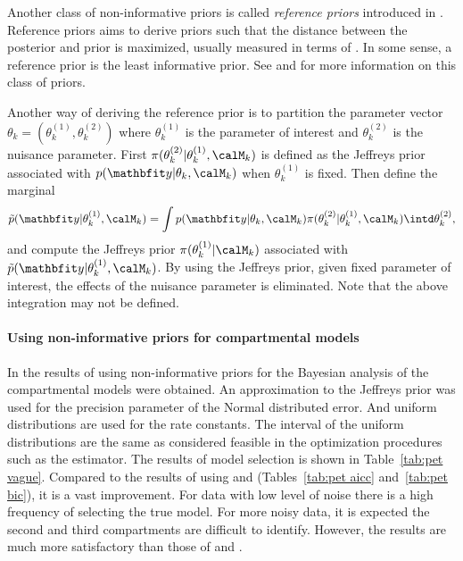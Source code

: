 Another class of non-informative priors is called \emph{reference priors}
introduced in \cite{Bernardo:1979uq}. Reference priors aims to derive priors
such that the distance between the posterior and prior is maximized, usually
measured in terms of \kld \cite{Kullback:1951va}. In some sense, a reference
prior is the least informative prior. See \cite{Berger:1989vj, Berger:1992kf,
  Berger:1992wo} and \cite[][sec.~5.4]{Bernardo:1994vd} for more information
on this class of priors.

Another way of deriving the reference prior is to partition the parameter
vector $\theta_k = (\theta_k^{(1)},\theta_k^{(2)})$ where $\theta_k^{(1)}$ is
the parameter of interest and $\theta_k^{(2)}$ is the nuisance parameter.
First $\pi(\theta_k^{(2)}|\theta_k^{(1)},\calM_k)$ is defined as the Jeffreys
prior associated with $p(\data|\theta_k,\calM_k)$ when $\theta_k^{(1)}$ is
fixed. Then define the marginal
\begin{equation}
  \tilde{p}(\data|\theta_k^{(1)},\calM_k) =
  \int p(\data|\theta_k,\calM_k)\pi(\theta_k^{(2)}|\theta_k^{(1)},\calM_k)
  \intd \theta_k^{(2)},
\end{equation}
and compute the Jeffreys prior $\pi(\theta_k^{(1)}|\calM_k)$ associated with
$\tilde{p}(\data|\theta_k^{(1)},\calM_k)$. By using the Jeffreys prior, given
fixed parameter of interest, the effects of the nuisance parameter is
eliminated. Note that the above integration may not be defined.

\paragraph{Using non-informative priors for \pet compartmental models}

In \cite{Zhou2013} the results of using non-informative priors for the
Bayesian analysis of the \pet compartmental models were obtained. An
approximation to the Jeffreys prior was used for the precision parameter of
the Normal distributed error. And uniform distributions are used for the rate
constants. The interval of the uniform distributions are the same as
considered feasible in the optimization procedures such as the \nls estimator.
The results of model selection is shown in Table~\ref{tab:pet vague}. Compared
to the results of using \aicc and \bic (Tables~\ref{tab:pet aicc}
and~\ref{tab:pet bic}), it is a vast improvement. For data with low level of
noise there is a high frequency of selecting the true model. For more noisy
data, it is expected the second and third compartments are difficult to
identify. However, the results are much more satisfactory than those of \aicc
and \bic.

